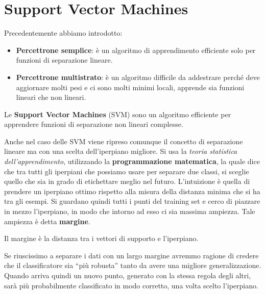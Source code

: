 \chapter{Support Vector Machines}
Precedentemente abbiamo introdotto:
\begin{itemize}
    \item \textbf{Percettrone semplice}: è un algoritmo di apprendimento efficiente
          solo per funzioni di separazione lineare.
    \item \textbf{Percettrone multistrato}: è un algoritmo difficile da addestrare
          perché deve aggiornare molti pesi e ci sono molti minimi locali, apprende
          sia funzioni lineari che non lineari.
\end{itemize}
Le \textbf{Support Vector Machines} (SVM) sono un algoritmo efficiente per
apprendere funzioni di separazione non lineari complesse.

Anche nel caso delle SVM viene ripreso comunque il concetto di separazione lineare
ma con una scelta dell'iperpiano migliore. Si usa la \textit{teoria statistica
    dell'apprendimento}, utilizzando la \textbf{programmazione matematica}, la quale
dice che tra tutti gli iperpiani che possiamo usare per separare due classi, si
sceglie quello che sia in grado di etichettare meglio nel futuro. L'intuizione
è quella di prendere un iperpiano ottimo rispetto alla misura della distanza minima
che si ha tra gli esempi. Si guardano quindi tutti i punti del training set e
cerco di piazzare in mezzo l'iperpiano, in modo che intorno ad esso ci sia massima
ampiezza. Tale ampiezza è detta \textbf{margine}.
\begin{definizione}
    Il margine è la distanza tra i vettori di supporto e l'iperpiano.
\end{definizione}
Se riuscissimo a separare i dati con un largo margine avremmo ragione di credere
che il classificatore sia “più robusta” tanto da avere una migliore generalizzazione.
Quando arriva quindi un nuovo punto, generato con la stessa regola degli altri,
sarà più probabilmente classificato in modo corretto, una volta scelto l'iperpiano.

